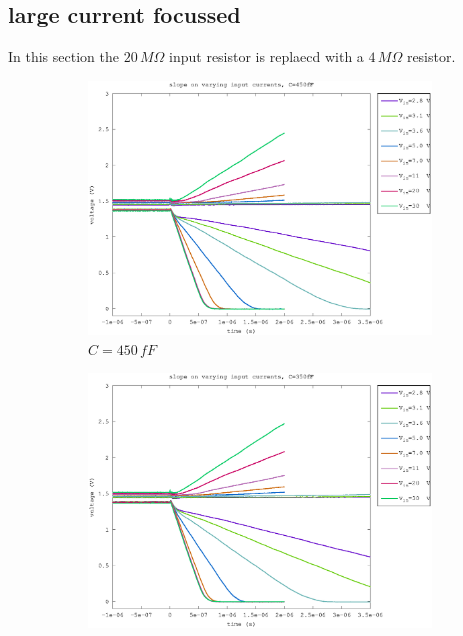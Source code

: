 \documentclass{article}
\begin{document}
\clearpage
\subsection{large current  focussed}
In this section the $20\,M\Omega$ input resistor is replaecd with a $4\,M\Omega$ resistor.
\begin{figure}[h]
	\centering
	\begin{subfigure}[b]{0.475\textwidth}
	    \centering
	    \includegraphics[width=\textwidth]{fig/bre_slope_450fF.eps}
	    \caption[Network2]%
	    {$C=450\,fF$}    
	    \label{fig:bre_slopes_450fF}
	\end{subfigure}
	\hfill
	\begin{subfigure}[b]{0.475\textwidth}  
	    \centering 
	    \includegraphics[width=\textwidth]{fig/bre_slope_350fF.eps}

\end{subfigure}
\end{figure}
\end{document}
